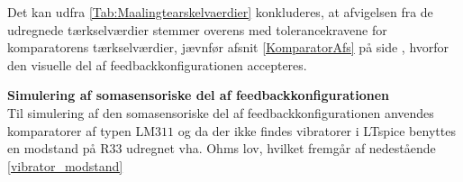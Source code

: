 
\noindent Det kan udfra \ref{Tab:Maalingtearskelvaerdier} konkluderes, at afvigelsen fra de udregnede tærkselværdier stemmer overens med tolerancekravene for komparatorens tærkselværdier, jævnfør afsnit \ref{KomparatorAfs} på side \pageref{KomparatorAfs}, hvorfor den visuelle del af feedbackkonfigurationen accepteres. 

\noindent\textbf{Simulering af somasensoriske del af feedbackkonfigurationen} \\
Til simulering af den somasensoriske del af feedbackkonfigurationen anvendes komparatorer af typen LM$311$ og da der ikke findes vibratorer i LTspice benyttes en modstand på R$33$ udregnet vha. Ohms lov, hvilket fremgår af nedestående \eqref{vibrator_modstand} 

